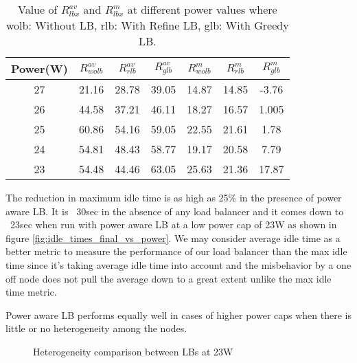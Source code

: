 \begin{table}[h]
\begin{tabular}{|c|c|c|c|c|c|c|}
\hline
Power(W) & $R^{av}_{wolb}$ & $R^{av}_{rlb}$ & $R^{av}_{glb}$ & $R^{m}_{wolb}$ & $R^{m}_{rlb}$ & $R^{m}_{glb}$ \\ \hline
27 & 21.16 & 28.78 & 39.05 & 14.87 & 14.85 & -3.76 \\ \hline
26 & 44.58 & 37.21 & 46.11 & 18.27 & 16.57 & 1.005 \\ \hline
25 & 60.86 & 54.16 & 59.05 & 22.55 & 21.61 & 1.78 \\ \hline
24 & 54.81 & 48.43 & 58.77 & 19.17 & 20.58 & 7.79 \\ \hline
23 & 54.48 & 44.46 & 63.05 & 25.63 & 21.36 & 17.87 \\ \hline
\end{tabular}
\caption{Value of $R^{av}_{lbx}$ and $R^{m}_{lbx}$ at different power values where wolb: Without LB, rlb: With Refine LB, glb: With Greedy LB. }
\label{tb:2}
\end{table}



The reduction in maximum idle time is as high as 25\% in the presence of power
aware LB. It is ~30sec in the absence of any load balancer and it comes down to
~23sec when run with power aware LB at a low power cap of 23W as shown in
figure \ref{fig:idle_times_final_vs_power}. 
We may consider average idle time as a better metric to measure the performance
of our load balancer than the max idle time since it’s taking average idle time
into account and the misbehavior by a one off node does not pull the average
down to a great extent unlike the max idle time metric.

Power aware LB performs equally well in cases of higher power caps when there
is little or no heterogeneity among the nodes. 

\begin{figure}
\centering
\caption{Heterogeneity comparison between LBs at 23W} 
\label{fig:heter_final}
\end{figure}

